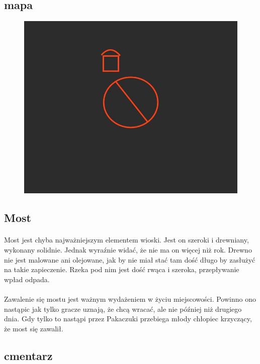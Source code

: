 \documentclass[ms,a4paper]{memoir}
\begin{document}
\subsection{mapa}
\begin{figure}
  \includegraphics[width=\linewidth]{mapa}
  \end{figure}

\subsection{Most}
\paragraph{}
Most jest chyba najważniejszym elementem wioski.
Jest on szeroki i drewniany, wykonany solidnie.
Jednak wyraźnie widać, że nie ma on więcej niż rok.
Drewno nie jest malowane ani olejowane, jak by nie miał stać tam dość długo by zasłużyć na takie zapieczenie.
Rzeka pod nim jest dość rwąca i szeroka, przepływanie wpład odpada.
\paragraph{}
Zawalenie się mostu jest ważnym wydażeniem w życiu miejscowości.
Powinno ono nastąpic jak tylko gracze uznają, że chcą wracać, ale nie później niż drugiego dnia.
Gdy tylko to nastąpi przez Pakaczuki przebiega młody chłopiec krzyczący, że most się zawalił.

\subsection{cmentarz}



\end{document}
